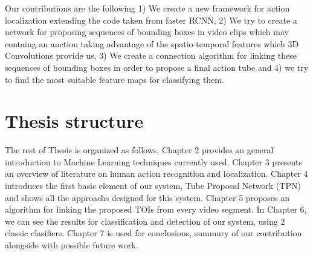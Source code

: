 Our contributions are the following 1) We create a new framework for action localization extending the code taken from faster RCNN,
2) We try to create a network for proposing sequences of bounding boxes in video clips which may containg an anction taking advantage
of the spatio-temporal features which 3D Convolutions provide us, 3) We create a connection algorithm for linking these sequences of
bounding boxes in order to propose a final action tube and 4) we try to find the most suitable feature maps for classifying them.

\section{Thesis structure}
The rest of Thesis is organized as follows. Chapter 2 provides an general introduction to Machine Learning techniques currently used.
Chapter 3 presents an overview of literature on human action recognition and localization. Chapter 4 introduces the first basic
element of our system, Tube Proposal Network (TPN) and shows all the approachs designed for this system. Chapter 5 proposes an algorithm
for linking the proposed TOIs from every video segment. In Chapter 6, we can see the results for classification and detection of our system,
using 2 classic clasifiers. Chapter 7 is used for conclusions, summury of our contribution alongside with possible future work.


% 
